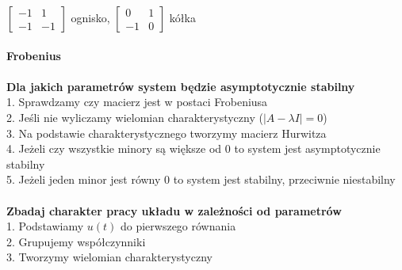$\left[\begin{array}{cc}-1&1\\-1&-1\end{array}\right]$ ognisko, $\left[\begin{array}{cc}0&1\\-1&0\end{array}\right]$ kółka\\
\\
\textbf{Frobenius}\\
\pagebreak\\
\textbf{Dla jakich parametrów system będzie asymptotycznie stabilny}\\
1. Sprawdzamy czy macierz jest w postaci Frobeniusa\\
2. Jeśli nie wyliczamy wielomian charakterystyczny ($|A-\lambda I|=0$)\\
3. Na podstawie charakterystycznego tworzymy macierz Hurwitza\\
4. Jeżeli czy wszystkie minory są większe od 0 to system jest asymptotycznie stabilny\\
5. Jeżeli jeden minor jest równy 0 to system jest stabilny, przeciwnie niestabilny\\
\\
\textbf{Zbadaj charakter pracy układu w zależności od parametrów}\\
1. Podstawiamy $u(t)$ do pierwszego równania\\
2. Grupujemy współczynniki\\
3. Tworzymy wielomian charakterystyczny\\
